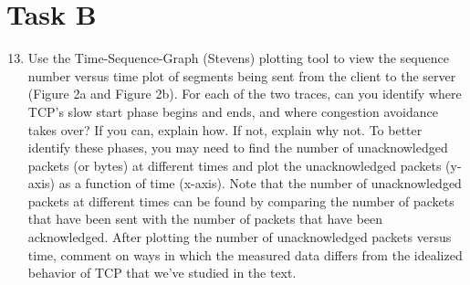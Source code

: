 \documentclass[10pt]{article}
\begin{document}
\section{Task B}
\begin{enumerate}
  \setcounter{enumi}{12}
  \item{Use the Time-Sequence-Graph (Stevens) plotting tool to view the sequence
  number versus time plot of segments being sent from the client to the server
  (Figure 2a and Figure 2b). For each of the two traces, can you identify where
  TCP's slow start phase begins and ends, and where congestion avoidance takes
  over? If you can, explain how. If not, explain why not. To better identify these
  phases, you may need to find the number of unacknowledged packets (or bytes) at
  different times and plot the unacknowledged packets (y-axis) as a function of
  time (x-axis). Note that the number of unacknowledged packets at different times
  can be found by comparing the number of packets that have been sent with the
  number of packets that have been acknowledged. After plotting the number of
  unacknowledged packets versus time, comment on ways in which the measured data
  differs from the idealized behavior of TCP that we've studied in the text.}



\end{enumerate}
\end{document}
